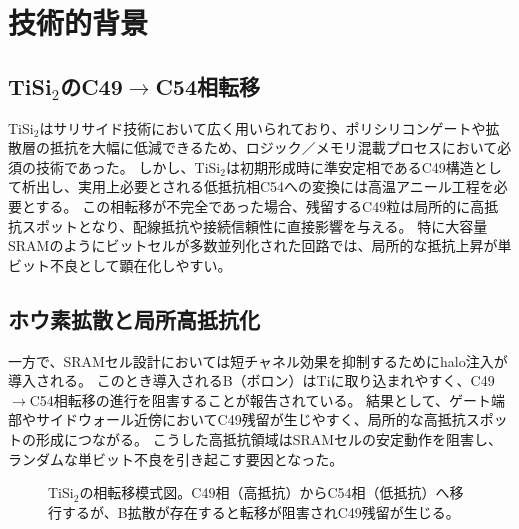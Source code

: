 \documentclass[conference]{IEEEtran}
\begin{document}
\section{技術的背景}
\subsection{TiSi$_2$のC49$\to$C54相転移}
TiSi$_2$はサリサイド技術において広く用いられており、ポリシリコンゲートや拡散層の抵抗を大幅に低減できるため、ロジック／メモリ混載プロセスにおいて必須の技術であった。  
しかし、TiSi$_2$は初期形成時に準安定相であるC49構造として析出し、実用上必要とされる低抵抗相C54への変換には高温アニール工程を必要とする。  
この相転移が不完全であった場合、残留するC49粒は局所的に高抵抗スポットとなり、配線抵抗や接続信頼性に直接影響を与える\cite{sze2007,wolf2000}。  
特に大容量SRAMのようにビットセルが多数並列化された回路では、局所的な抵抗上昇が単ビット不良として顕在化しやすい。

\subsection{ホウ素拡散と局所高抵抗化}
一方で、SRAMセル設計においては短チャネル効果を抑制するためにhalo注入が導入される。  
このとき導入されるB（ボロン）はTiに取り込まれやすく、C49$\to$C54相転移の進行を阻害することが報告されている。  
結果として、ゲート端部やサイドウォール近傍においてC49残留が生じやすく、局所的な高抵抗スポットの形成につながる。  
こうした高抵抗領域はSRAMセルの安定動作を阻害し、ランダムな単ビット不良を引き起こす要因となった。

\begin{figure}[H]
\centering
{}
\caption{TiSi$_2$の相転移模式図。C49相（高抵抗）からC54相（低抵抗）へ移行するが、B拡散が存在すると転移が阻害されC49残留が生じる。}
\label{fig:ti_phase}
\end{figure}
\end{document}
